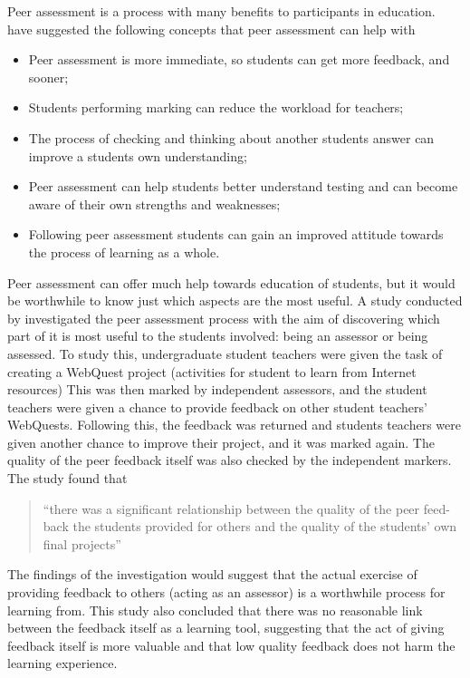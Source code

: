 \documentclass[sigplan,10pt,review]{acmart}\settopmatter{printfolios=true}
\begin{document}
Peer assessment is a process with many benefits to participants in
education. \citet{sadler_impact_2006} have suggested the
following concepts that peer assessment can help with
\begin{itemize}
\item Peer assessment is more immediate, so students can get more
  feedback, and sooner;
\item Students performing marking can reduce the workload for
  teachers;
\item The process of checking and thinking about another students
  answer can improve a students own understanding;
\item Peer assessment can help students better understand testing and
  can become aware of their own strengths and weaknesses;
\item Following peer assessment students can gain an improved attitude
  towards the process of learning as a whole.
\end{itemize}

Peer assessment can offer much help towards education of students, but
it would be worthwhile to know just which aspects are the most
useful. A study conducted by \citet{li_assessor_2010} investigated the
peer assessment process with the aim of discovering which part of it
is most useful to the students involved: being an assessor or being
assessed. To study this, undergraduate student teachers were given the
task of creating a WebQuest project (activities for student to learn
from Internet resources) This was then marked by independent
assessors, and the student teachers were given a chance to provide
feedback on other student teachers' WebQuests. Following this, the
feedback was returned and students teachers were given another chance
to improve their project, and it was marked again. The quality of the
peer feedback itself was also checked by the independent markers. The
study found that

\begin{quote}
  ``there was a significant relationship between the quality of the
  peer feed-back the students provided for others and the quality of
  the students' own final projects''
\end{quote}

The findings of the investigation would suggest that the actual
exercise of providing feedback to others (acting as an assessor) is a
worthwhile process for learning from. This study also concluded that
there was no reasonable link between the feedback itself as a learning
tool, suggesting that the act of giving feedback itself is more
valuable and that low quality feedback does not harm the learning
experience.
\end{document}
